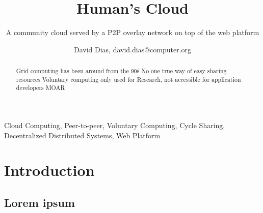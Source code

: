 \documentclass{./llncs2e/llncs}
\begin{document}
\title{Human's Cloud}

\subtitle{A community cloud served by a P2P overlay network on top of the web platform}
\author{David Dias, david.dias@computer.org}

\maketitle



% 
% 

\begin{abstract}
Grid computing has been around from the 90\'s
No one true way of easy sharing resources
Voluntary computing only used for Research, not accessible for application developers
MOAR

\end{abstract}




% 
% 

\begin{keywords}
Cloud Computing, Peer-to-peer, Voluntary Computing, Cycle Sharing, Decentralized Distributed Systems, Web Platform 
\end{keywords}




% 
% 

\section{Introduction}

\subsection{Lorem ipsum}
\end{document}

